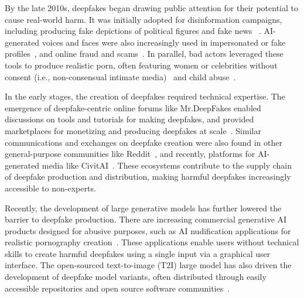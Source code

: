 By the late 2010s, deepfakes began drawing public attention for their potential to cause real-world harm. It was initially adopted for disinformation campaigns, including producing fake depictions of political figures and fake news ~\cite{westerlund2019emergence, hwang2021effects,al2023impact}. AI-generated voices and faces were also increasingly used in impersonated or fake profiles~\cite{mink2022deepphish, ruffin2024does, yang2024characteristics}, and online fraud and scams~\cite{zhai2025hear, ferrara2019history}. In parallel, bad actors leveraged these tools to produce realistic porn, often featuring women or celebrities without consent (i.e., non-consensual intimate media)~\cite{westerlund2019emergence, al2023impact, umbach2024non,brigham2024violation} and child abuse~\cite{thiel2023generative}. %

In the early stages, the creation of deepfakes required technical expertise. The emergence of deepfake-centric online forums like Mr.DeepFakes enabled discussions on tools and tutorials for making deepfakes, and provided marketplaces for monetizing and producing deepfakes at scale~\cite{han2025characterizing, timmerman2023studying}. Similar communications and exchanges on deepfake creation were also found in other general-purpose communities like Reddit~\cite{gamage2022deepfakes, timmerman2023studying}, and recently, platforms for AI-generated media like CivitAI~\cite{ghosh2026marketplace}. These ecosystems contribute to the supply chain of deepfake production and distribution, making harmful deepfakes increasingly accessible to non-experts.

Recently, the development of large generative models has further lowered the barrier to deepfake production. There are increasing commercial generative AI products designed for abusive purposes, such as AI nudification applications for realistic pornography creation~\cite{gibson2025analyzing}. These applications enable users without technical skills to create harmful deepfakes using a single input via a graphical user interface. The open-sourced text-to-image (T2I) large model has also driven the development of deepfake model variants, often distributed through easily accessible repositories and open source software communities~\cite{hawkins2025deepfakes, wei2024exploring}. 

